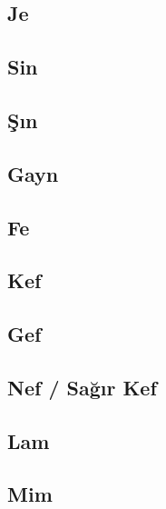 \subsection*{Je}
\uyumluharftablo{\arje}{\latupje\latdownje}{\isimje}{\trtlfje}

\subsection*{Sin}
\uyumluharftablo{\arsin}{\latupsin\latdownsin}{\isimsin}{\trtlfsin}

\subsection*{Şın}
\uyumluharftablo{\arshin}{\latupshin\latdownshin}{\isimshin}{\trtlfshin}

\subsection*{Gayn}
\uyumluharftablo{\argayn}{\latupgayn\latdowngayn}{\isimgayn}{\trtlfgayn}

\subsection*{Fe}
\uyumluharftablo{\arfe}{\latupfe\latdownfe}{\isimfe}{\trtlffe}

\subsection*{Kef}
\uyumluharftablo{\arkef}{\latupkef\latdownkef}{\isimkef}{\trtlfkef}

\subsection*{Gef}
\uyumluharftablo{\argef}{\latupgef\latdowngef}{\isimgef}{\trtlfgef}

\subsection*{Nef / Sağır Kef}
\uyumluharftablo{\arnef}{\latupnef\latdownnef}{\isimnef}{\trtlfnef}

\subsection*{Lam}
\uyumluharftablo{\arlam}{\latuplam\latdownlam}{\isimlam}{\trtlflam}

\subsection*{Mim}
\uyumluharftablo{\armim}{\latupmim\latdownmim}{\isimmim}{\trtlfmim}

